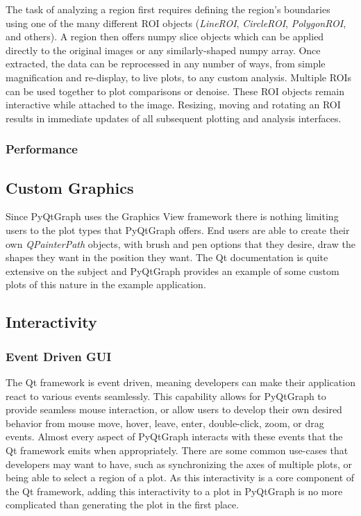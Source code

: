 \documentclass[journal]{vgtc}                %
\begin{document}
The task of analyzing a region first requires defining the region's boundaries using one of the many different ROI objects (\emph{LineROI}, \emph{CircleROI}, \emph{PolygonROI}, and others). A region then offers numpy slice objects which can be applied directly to the original images or any similarly-shaped numpy array. Once extracted, the data can be reprocessed in any number of ways, from simple magnification and re-display, to live plots, to any custom analysis. Multiple ROIs can be used together to plot comparisons or denoise. These ROI objects remain interactive while attached to the image. Resizing, moving and rotating an ROI results in immediate updates of all subsequent plotting and analysis interfaces.


\subsubsection{Performance}


\subsection{Custom Graphics}

Since PyQtGraph uses the Graphics View framework there is nothing limiting users to the plot types that PyQtGraph offers.  End users are able to create their own \emph{QPainterPath} objects, with brush and pen options that they desire, draw the shapes they want in the position they want.  The Qt documentation is quite extensive on the subject and PyQtGraph provides an example of some custom plots of this nature in the example application.

\subsection{Interactivity}
\subsubsection{Event Driven GUI}

The Qt framework is event driven, meaning developers can make their application react to various events seamlessly.  This capability allows for PyQtGraph to provide seamless mouse interaction, or allow users to develop their own desired behavior from mouse move, hover, leave, enter, double-click, zoom, or drag events.  Almost every aspect of PyQtGraph interacts with these events that the Qt framework emits when appropriately.  There are some common use-cases that developers may want to have, such as synchronizing the axes of multiple plots, or being able to select a region of a plot.  As this interactivity is a core component of the Qt framework, adding this interactivity to a plot in PyQtGraph is no more complicated than generating the plot in the first place.
\end{document}
